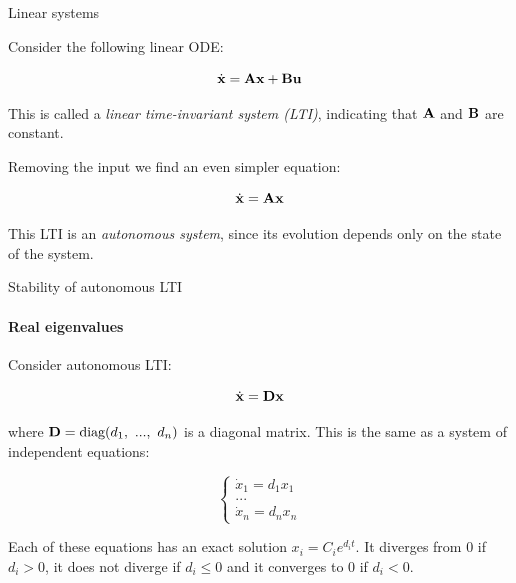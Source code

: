 \documentclass{beamer}
\begin{document}
\begin{frame}{Linear systems}
\begin{flushleft}

Consider the following linear ODE:

\begin{equation}
    \dot{\mathbf{x}} = \mathbf{A} \mathbf{x} + \mathbf{B} \mathbf{u}
\end{equation}

This is called a \emph{linear time-invariant system (LTI)}, indicating that $\mathbf{A}$ and $\mathbf{B}$ are constant.

\bigskip

Removing the input we find an even simpler equation:

\begin{equation}
    \dot{\mathbf{x}} = \mathbf{A} \mathbf{x}
\end{equation}

This LTI is an \emph{autonomous system}, since its evolution depends only on the state of the system.

\end{flushleft}
\end{frame}




\begin{frame}{Stability of autonomous LTI}
	\framesubtitle{Real eigenvalues}
	\begin{flushleft}
		
		Consider autonomous LTI:
		
		\begin{equation}
			\dot{\mathbf{x}} = \mathbf{D} \mathbf{x}
		\end{equation}
		
		where $\bo{D} = \text{diag}(d_1, \ ..., \ d_n)$ is a diagonal matrix. This is the same as a system of independent equations: 
		
		\begin{equation}
			\begin{cases}
				\dot{x}_1 = d_1 x_1 \\
				... \\
				\dot{x}_n = d_n x_n
			\end{cases}
		\end{equation}		
		
		Each of these equations has an exact solution $ x_i = C_i e^{d_i t}$. It diverges from 0 if $d_i > 0$, it does not diverge if $d_i \leq 0$ and it converges to 0 if $d_i < 0$.
		
	\end{flushleft}
\end{frame}
\end{document}
